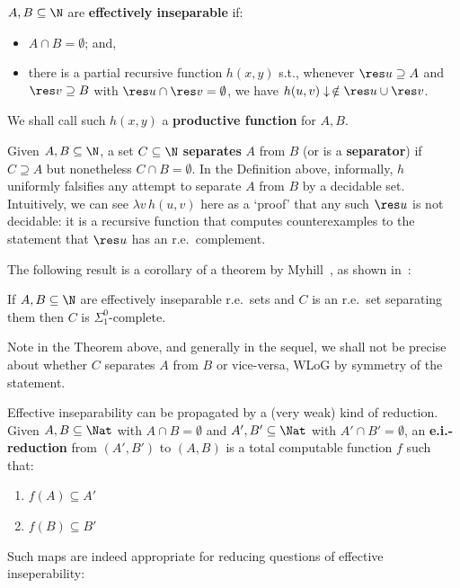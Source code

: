 \documentclass[runningheads]{amsart}
\begin{document}
\begin{definition}
$A,B\subseteq \N$ are \textbf{effectively inseparable} if:
\begin{itemize}
    \item $A \cap B = \emptyset$; and,
    \item there is a partial recursive function $h(x,y)$ s.t., whenever $\res u \supseteq A$ and $\res v \supseteq B$ with $\res u \cap \res v = \emptyset$, we have $h(u,v) \downarrow\,  \notin \res u \cup \res v$. 
\end{itemize}
We shall call such $h(x,y)$ a \textbf{productive function} for $A,B$.
\end{definition}


Given $A,B \subseteq \N$, a set $C\subseteq \N $ \textbf{separates} $A$ from $B$ (or is a \textbf{separator}) if $C\supseteq A$ but nonetheless $C\cap B = \emptyset$. 
In the Definition above, informally, $h$ uniformly falsifies any attempt to separate $A$ from $B$ by a decidable set.
Intuitively, we can see $\lambda v\,  h(u,v)$ here as a `proof' that any such $\res u$ is not decidable: it is a recursive function that computes counterexamples to the statement that $\res u$ has an r.e.\ complement.

The following result is a corollary of a theorem by Myhill~\cite{Myhill1955}, as shown in~\cite[Exercise 11-14]{Rogers1987}:
\begin{theorem}
\label{separator-of-eff-insep-sets-is-S01-complete}
If $A,B \subseteq \N $ are effectively inseparable r.e.\ sets and $C$ is an r.e.\ set separating them then $C$ is $\Sigma^0_1$-complete.
\end{theorem}

Note in the Theorem above, and generally in the sequel, we shall not be precise about whether $C$ separates $A$ from $B$ or vice-versa, WLoG by symmetry of the statement.


Effective inseparability can be propagated by a (very weak) kind of reduction.
Given $A,B\subseteq \Nat$ with $A\cap B = \emptyset$ and $A', B'\subseteq \Nat$ with $A' \cap B' = \emptyset$, an \textbf{e.i.-reduction} from $(A',B')$ to $(A,B)$ is a total computable function $f$ such that: 
\begin{enumerate}
\item\label{item:f(A)-in-A'} $f(A) \subseteq A'$
\item\label{item:f(B)-in-B'} $f(B) \subseteq B'$
\end{enumerate}
Such maps are indeed appropriate for reducing questions of effective inseperability:
\end{document}
